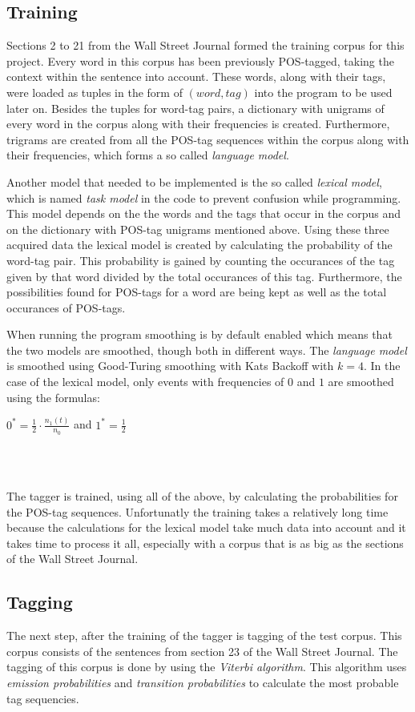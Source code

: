 \documentclass[10pt, a4paper]{article}
\begin{document}
\subsection*{Training}
Sections 2 to 21 from the Wall Street Journal formed the training corpus for this project. Every word in this corpus has been previously POS-tagged, taking the context within the sentence into account. These words, along with their tags, were loaded as tuples in the form of $(word, tag)$ into the program to be used later on. Besides the tuples for word-tag pairs, a dictionary with unigrams of every word in the corpus along with their frequencies is created. Furthermore, trigrams are created from all the POS-tag sequences within the corpus along with their frequencies, which forms a so called \textit{language model}. 

Another model that needed to be implemented is the so called \textit{lexical model}, which is named \textit{task model} in the code to prevent confusion while programming. This model depends on the the words and the tags that occur in the corpus and on the dictionary with POS-tag unigrams mentioned above. Using these three acquired data the lexical model is created by calculating the probability of the word-tag pair. This probability is gained by counting the occurances of the tag given by that word divided by the total occurances of this tag. Furthermore, the possibilities found for POS-tags for a word are being kept as well as the total occurances of POS-tags.

When running the program smoothing is by default enabled which means that the two models are smoothed, though both in different ways. The \textit{language model} is smoothed using Good-Turing smoothing with Kats Backoff with $k = 4$. In the case of the lexical model, only events with frequencies of $0$ and $1$ are smoothed using the formulas:\\

\centerline{$0^* = \frac{1}{2} \cdot \frac{n_1 (t)}{n_0}$ and $1^* = \frac{1}{2}$}\\\

The tagger is trained, using all of the above, by calculating the probabilities for the POS-tag sequences. Unfortunatly the training takes a relatively long time because the calculations for the lexical model take much data into account and it takes time to process it all, especially with a corpus that is as big as the sections of the Wall Street Journal.

\subsection*{Tagging}
The next step, after the training of the tagger is tagging of the test corpus. This corpus consists of the sentences from section 23 of the Wall Street Journal. The tagging of this corpus is done by using the \textit{Viterbi algorithm}. This algorithm uses \textit{emission probabilities} and \textit{transition probabilities} to calculate the most probable tag sequencies. 
\end{document}
